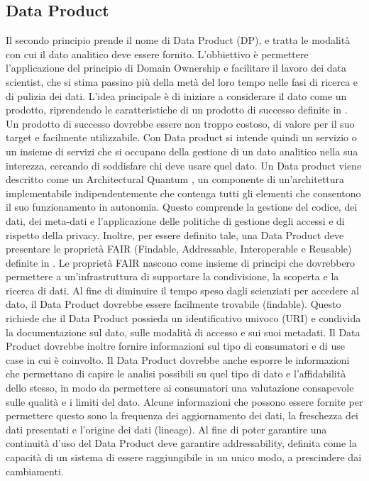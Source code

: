 \documentclass[12pt]{report}
\begin{document}
\subsection{Data Product}
Il secondo principio prende il nome di Data Product (DP), e tratta le modalità con cui il dato analitico deve essere fornito.
L'obbiettivo è permettere l'applicazione del principio di Domain Ownership e facilitare il lavoro dei data scientist, che si stima passino più della metà del loro tempo nelle fasi di ricerca e di pulizia dei dati.
L'idea principale è di iniziare a considerare il dato come un prodotto, riprendendo le caratteristiche di un prodotto di successo definite in \cite{cagan_inspired_2017}. 
Un prodotto di successo dovrebbe essere non troppo costoso, di valore per il suo target e facilmente utilizzabile.
Con Data product si intende quindi un servizio o un insieme di servizi che si occupano della gestione di un dato analitico nella sua interezza, cercando di soddisfare chi deve usare quel dato.
Un Data product viene descritto come un Architectural Quantum \cite{ford_building_2022}, un componente di un'architettura implementabile indipendentemente che contenga tutti gli elementi che consentono il suo funzionamento in autonomia.
Questo comprende la gestione del codice, dei dati, dei meta-dati e l'applicazione delle politiche di gestione degli accessi e di rispetto della privacy.
Inoltre, per essere definito tale, una Data Product deve presentare le proprietà FAIR (Findable, Addressable, Interoperable e Reusable) definite in \cite{wilkinson_fair_2016}. 
Le proprietà FAIR nascono come insieme di principi che dovrebbero permettere a un'infrastruttura di supportare la condivisione, la scoperta e la ricerca di dati. 
Al fine di diminuire il tempo speso dagli scienziati per accedere al dato, il Data Product dovrebbe essere facilmente trovabile (findable).
Questo richiede che il Data Product possieda un identificativo univoco (URI) e condivida la documentazione sul dato, sulle modalità di accesso e sui suoi metadati.
Il Data Product dovrebbe inoltre fornire informazioni sul tipo di consumatori e di use case in cui è coinvolto. 
Il Data Product dovrebbe anche esporre le informazioni che permettano di capire le analisi possibili su quel tipo di dato e l'affidabilità dello stesso, in modo da permettere ai consumatori una valutazione consapevole sulle qualità e i limiti del dato.
Alcune informazioni che possono essere fornite per permettere questo sono la frequenza dei aggiornamento dei dati, la freschezza dei dati presentati e l'origine dei dati (lineage).
Al fine di poter garantire una continuità d'uso del Data Product deve garantire addressability, definita come la capacità di un sistema di essere raggiungibile in un unico modo, a prescindere dai cambiamenti.
\end{document}
